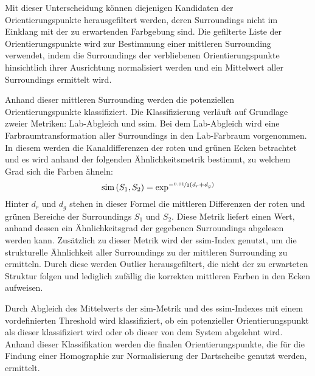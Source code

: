 Mit dieser Unterscheidung können diejenigen Kandidaten der Orientierungspunkte herausgefiltert werden, deren Surroundings nicht im Einklang mit der zu erwartenden Farbgebung sind. Die gefilterte Liste der Orientierungspunkte wird zur Bestimmung einer mittleren Surrounding verwendet, indem die Surroundings der verbliebenen Orientierungspunkte hinsichtlich ihrer Ausrichtung normalisiert werden und ein Mittelwert aller Surroundings ermittelt wird.

Anhand dieser mittleren Surrounding werden die potenziellen Orientierungspunkte klassifiziert. Die Klassifizierung verläuft auf Grundlage zweier Metriken: Lab-Abgleich und \ac{ssim}. Bei dem Lab-Abgleich wird eine Farbraumtransformation aller Surroundings in den Lab-Farbraum vorgenommen. In diesem werden die Kanaldifferenzen der roten und grünen Ecken betrachtet und es wird anhand der folgenden Ähnlichkeitsmetrik bestimmt, zu welchem Grad sich die Farben ähneln:
\[\text{sim}\left(S_1, S_2\right) = \exp^{-\nicefrac{0.01}{2}(d_r + d_g)}\]
Hinter $d_r$ und $d_g$ stehen in dieser Formel die mittleren Differenzen der roten und grünen Bereiche der Surroundings $S_1$ und $S_2$. Diese Metrik liefert einen Wert, anhand dessen ein Ähnlichkeitsgrad der gegebenen Surroundings abgelesen werden kann. Zusätzlich zu dieser Metrik wird der \ac{ssim}-Index genutzt, um die strukturelle Ähnlichkeit aller Surroundings zu der mittleren Surrounding zu ermitteln. Durch diese werden Outlier herausgefiltert, die nicht der zu erwarteten Struktur folgen und lediglich zufällig die korrekten mittleren Farben in den Ecken aufweisen.

Durch Abgleich des Mittelwerts der $\text{sim}$-Metrik und des \ac{ssim}-Indexes mit einem vordefinierten Threshold wird klassifiziert, ob ein potenzieller Orientierungspunkt als dieser klassifiziert wird oder ob dieser von dem System abgelehnt wird. Anhand dieser Klassifikation werden die finalen Orientierungspunkte, die für die Findung einer Homographie zur Normalisierung der Dartscheibe genutzt werden, ermittelt.
